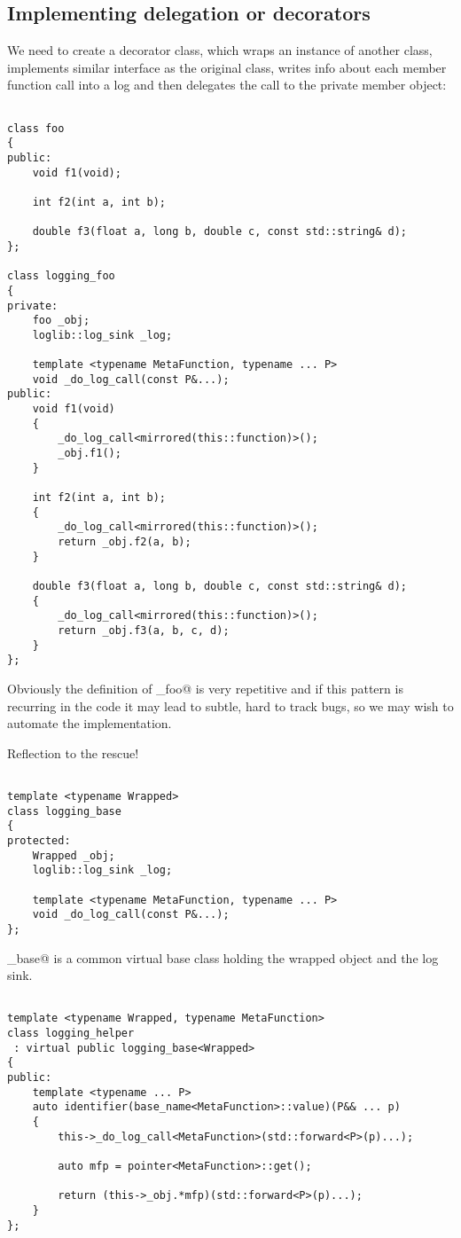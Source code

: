 \subsection{Implementing delegation or decorators}

We need to create a decorator class, which wraps an instance of another
class, implements similar interface as the original class, writes info about
each member function call into a log and then delegates the call to the private member object:

\begin{verbatim}

class foo
{
public:
	void f1(void);

	int f2(int a, int b);

	double f3(float a, long b, double c, const std::string& d);
};

class logging_foo
{
private:
	foo _obj;
	loglib::log_sink _log;

	template <typename MetaFunction, typename ... P>
	void _do_log_call(const P&...);
public:
	void f1(void)
	{
		_do_log_call<mirrored(this::function)>();
		_obj.f1();
	}

	int f2(int a, int b);
	{
		_do_log_call<mirrored(this::function)>();
		return _obj.f2(a, b);
	}

	double f3(float a, long b, double c, const std::string& d);
	{
		_do_log_call<mirrored(this::function)>();
		return _obj.f3(a, b, c, d);
	}
};

\end{verbatim}

Obviously the definition of \verb@logging_foo@ is very repetitive and if this
pattern is recurring in the code it may lead to subtle, hard to track bugs,
so we may wish to automate the implementation.

Reflection to the rescue!

\begin{verbatim}

template <typename Wrapped>
class logging_base
{
protected:
	Wrapped _obj;
	loglib::log_sink _log;

	template <typename MetaFunction, typename ... P>
	void _do_log_call(const P&...);
};

\end{verbatim}

\verb@logging_base@ is a common virtual base class holding the wrapped object
and the log sink.

\begin{verbatim}

template <typename Wrapped, typename MetaFunction>
class logging_helper
 : virtual public logging_base<Wrapped>
{
public:
	template <typename ... P>
	auto identifier(base_name<MetaFunction>::value)(P&& ... p)
	{
		this->_do_log_call<MetaFunction>(std::forward<P>(p)...);

		auto mfp = pointer<MetaFunction>::get();

		return (this->_obj.*mfp)(std::forward<P>(p)...);
	}
};

\end{verbatim}


